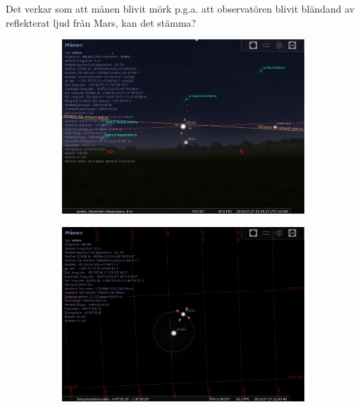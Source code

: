 \documentclass[./exercises.tex]{subfiles}
\begin{document}
\begin{itemize}
 Det verkar som att månen blivit mörk p.g.a. att observatören
blivit bländand av reflekterat ljud från Mars, kan det stämma?
\begin{figure}[H]
     \centering
     \begin{subfigure}[b]{0.45\textwidth}
         \centering
         \includegraphics[width=\textwidth]{Stellarium1/20180727/stellarium-000.png}
         \caption{}
         \label{fig:y equals x}
     \end{subfigure}
     \hfill
     \begin{subfigure}[b]{0.45\textwidth}
         \centering
         \includegraphics[width=\textwidth]{Stellarium1/20180727/stellarium-001.png}
         \caption{}
         \label{fig:three sin x}
     \end{subfigure}

\end{figure}
\end{itemize}
\end{document}
